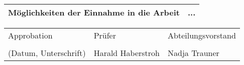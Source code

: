 \begin{center}
\begin{tabular}{| m{8cm} | m{8cm} |}
    \hline
    Möglichkeiten der Einnahme in die Arbeit & ...\\ %
    \hline
\end{tabular}

\vspace{5mm}

\begin{tabular}{| m{5cm} | m{6cm} | m{5cm} |}
    \hline
    Approbation & Prüfer & Abteilungsvorstand\\
    &&\\
    (Datum, Unterschrift) & Harald Haberstroh & Nadja Trauner\\ %
    \hline
\end{tabular}

\end{center}


